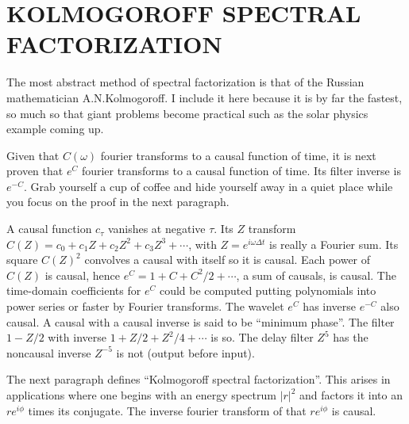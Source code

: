 \section{KOLMOGOROFF SPECTRAL FACTORIZATION}
The most abstract method of spectral factorization is that of the Russian mathematician A.N.Kolmogoroff.
I include it here because it is by far the fastest,
so much so that giant problems become practical
such as the solar physics example coming up.

\par
Given that $C(\omega)$ fourier transforms to a causal function of time,
it is next proven that $e^C$ fourier transforms to a causal function of time.
Its filter inverse is $e^{-C}$.
Grab yourself a cup of coffee
and hide yourself away in a quiet place
while you focus on the proof in the next paragraph.

\par
A causal function $c_\tau$ vanishes at negative $\tau$.
Its $Z$ transform $C(Z) = c_0 + c_1 Z + c_2 Z^2 + c_3 Z^3 +\cdots$,
with $Z=e^{i\omega\Delta t}$ is really a Fourier sum.
Its square $C(Z)^2$
convolves a causal with itself so it is causal.
Each power of $C(Z)$ is causal, hence
$e^C=1+C+C^2/2+\cdots$, a sum of causals, is causal.
The time-domain coefficients for $e^C$ could be computed
putting polynomials into power series or faster by Fourier transforms.
The wavelet $e^C$ has inverse $e^{-C}$ also causal.
A causal with a causal inverse is said to be ``minimum phase''.
The filter $1-Z/2$ with inverse $1+Z/2+Z^2/4+\cdots$ is so.
The delay filter $Z^5$ has the noncausal inverse $Z^{-5}$ is not
(output before input).

\par
The next paragraph defines ``Kolmogoroff spectral factorization''.
This arises in applications where one begins with an energy spectrum $|r|^2$
and factors it into an $r e^{i\phi}$ times its conjugate.
The inverse fourier transform of that  $r e^{i\phi}$ is causal.


